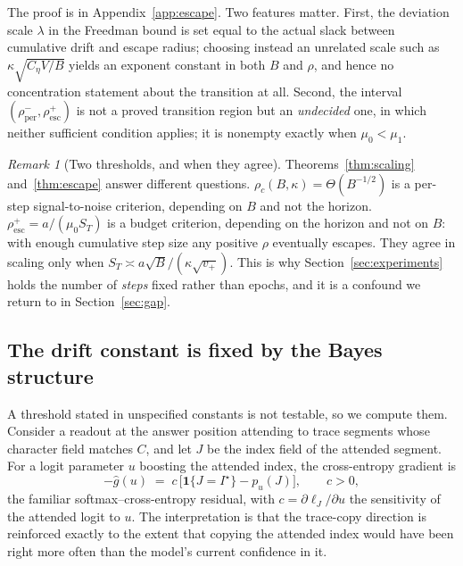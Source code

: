 \documentclass{article}
\theoremstyle{plain}
\theoremstyle{definition}
\theoremstyle{remark}
\newtheorem{remark}{Remark}
\newcommand{\1}{\mathbf{1}}
\begin{document}
The proof is in Appendix~\ref{app:escape}. Two features matter. First, the
deviation scale $\lambda$ in the Freedman bound is set equal to the actual slack
between cumulative drift and escape radius; choosing instead an unrelated scale
such as $\kappa\sqrt{C_\eta V/B}$ yields an exponent constant in both $B$ and
$\rho$, and hence no concentration statement about the transition at all. Second,
the interval $(\rho^{-}_{\mathrm{per}},\rho^{+}_{\mathrm{esc}})$ is not a proved
transition region but an \emph{undecided} one, in which neither sufficient
condition applies; it is nonempty exactly when $\mu_0<\mu_1$.

\begin{remark}[Two thresholds, and when they agree]
\label{rem:twothresholds}
Theorems~\ref{thm:scaling} and~\ref{thm:escape} answer different questions.
$\rho_c(B,\kappa) = \Theta(B^{-1/2})$ is a per-step signal-to-noise criterion,
depending on $B$ and not the horizon. $\rho^{+}_{\mathrm{esc}} = a/(\mu_0S_T)$ is
a budget criterion, depending on the horizon and not on $B$: with enough
cumulative step size any positive $\rho$ eventually escapes. They agree in
scaling only when $S_T\asymp a\sqrt B/(\kappa\sqrt{v_+})$. This is why
Section~\ref{sec:experiments} holds the number of \emph{steps} fixed rather than
epochs, and it is a confound we return to in Section~\ref{sec:gap}.
\end{remark}

\subsection{The drift constant is fixed by the Bayes structure}
\label{sec:drift}

A threshold stated in unspecified constants is not testable, so we compute them.
Consider a readout at the answer position attending to trace segments whose
character field matches $C$, and let $J$ be the index field of the attended
segment. For a logit parameter $u$ boosting the attended index, the
cross-entropy gradient is
\begin{equation}
\label{eq:gradform}
-\hat g(u) \;=\; c\,\big[\1\{J = I^\star\} - p_u(J)\big],
\qquad c > 0,
\end{equation}
the familiar softmax--cross-entropy residual, with $c = \partial\ell_J/\partial u$
the sensitivity of the attended logit to $u$. The interpretation is that the
trace-copy direction is reinforced exactly to the extent that copying the
attended index would have been right more often than the model's current
confidence in it.
\end{document}
